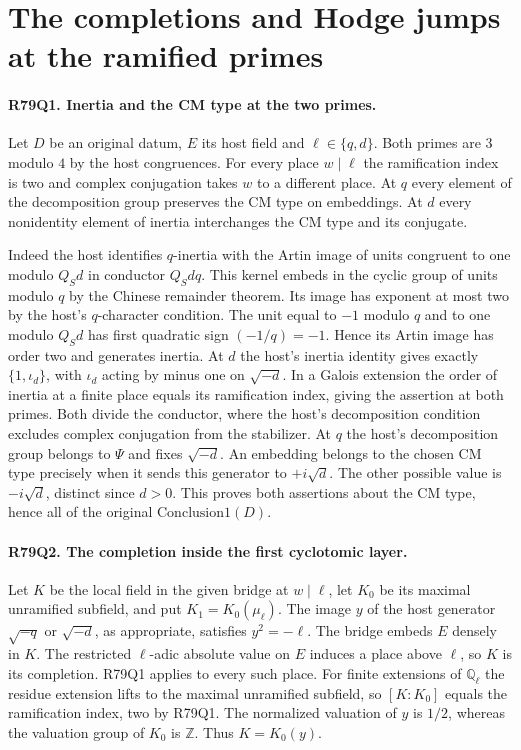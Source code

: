 \section{The completions and Hodge jumps at the ramified primes}

\paragraph{R79Q1. Inertia and the CM type at the two primes.}
Let $D$ be an original datum, $E$ its host field and
$\ell\in\{q,d\}$. Both primes are $3$ modulo $4$ by the host
congruences. For every place $w\mid\ell$ the ramification index is
two and complex conjugation takes $w$ to a different place.
At $q$ every element of the decomposition group preserves the CM
type on embeddings. At $d$ every nonidentity element of inertia
interchanges the CM type and its conjugate.

Indeed the host identifies $q$-inertia with the Artin image of
units congruent to one modulo $Q_Sd$ in conductor $Q_S d q$.
This kernel embeds in the cyclic group of units modulo $q$ by
the Chinese remainder theorem. Its image has exponent at most two
by the host's $q$-character condition. The unit equal to $-1$
modulo $q$ and to one modulo $Q_S d$ has first quadratic sign
$(-1/q)=-1$. Hence its Artin image has order two and generates
inertia. At $d$ the host's inertia identity gives exactly
$\{1,\iota_d\}$, with $\iota_d$ acting by minus one on
$\sqrt{-d}$. In a Galois extension the order of inertia at a
finite place equals its ramification index, giving the assertion at
both primes. Both divide the conductor, where the host's
decomposition condition excludes complex conjugation from the
stabilizer. At $q$ the host's decomposition group belongs to
$\Psi$ and fixes $\sqrt{-d}$. An embedding belongs to the chosen
CM type precisely when it sends this generator to $+i\sqrt d$.
The other possible value is $-i\sqrt d$, distinct since $d>0$.
This proves both assertions about the CM type, hence all of the
original $\mathrm{Conclusion1}(D)$.

\paragraph{R79Q2. The completion inside the first cyclotomic layer.}
Let $K$ be the local field in the given bridge at $w\mid\ell$,
let $K_0$ be its maximal unramified subfield, and put
$K_1=K_0(\mu_\ell)$. The image $y$ of the host generator
$\sqrt{-q}$ or $\sqrt{-d}$, as appropriate, satisfies $y^2=-\ell$.
The bridge embeds $E$ densely in $K$. The restricted $\ell$-adic
absolute value on $E$ induces a place above $\ell$, so $K$ is
its completion. R79Q1 applies to every such place.
For finite extensions of $\mathbb Q_\ell$ the residue extension
lifts to the maximal unramified subfield, so $[K:K_0]$ equals the
ramification index, two by R79Q1. The normalized valuation of $y$
is $1/2$, whereas the valuation group of $K_0$ is $\mathbb Z$.
Thus $K=K_0(y)$.

